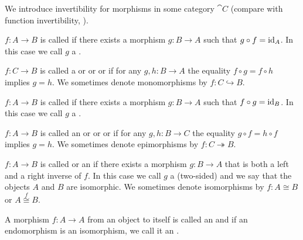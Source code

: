 \begin{definition}\label{def:morphism_invertibility}
  We introduce invertibility for morphisms in some category \( \cat{C} \) (compare with function invertibility, ).

  \begin{defenum}
     \( f: A \to B \) is called  if there exists a morphism \( g: B \to A \) such that \( g \circ f = \operatorname{id}_A \). In this case we call \( g \) a .

     \( f: C \to B \) is called a  or  or  or  if for any \( g, h: B \to A \) the equality \( f \circ g = f \circ h \) implies \( g = h \). We sometimes denote monomorphisms by \( f: C \hookrightarrow B \).

     \( f: A \to B \) is called  if there exists a morphism \( g: B \to A \) such that \( f \circ g = \operatorname{id}_B \). In this case we call \( g \) a .

     \( f: A \to B \) is called an  or  or  or  if for any \( g, h: B \to C \) the equality \( g \circ f = h \circ f \) implies \( g = h \). We sometimes denote epimorphisms by \( f: C \twoheadrightarrow B \).

     \( f: A \to B \) is called  or an  if there exists a morphism \( g: B \to A \) that is both a left and a right inverse of \( f \). In this case we call \( g \) a (two-sided)  and we say that the objects \( A \) and \( B \) are isomorphic. We sometimes denote isomorphisms by \( f: A \cong B \) or \( A \overset f \cong B \).

     A morphism \( f: A \to A \) from an object to itself is called an  and if an endomorphism is an isomorphism, we call it an .
  \end{defenum}
\end{definition}

